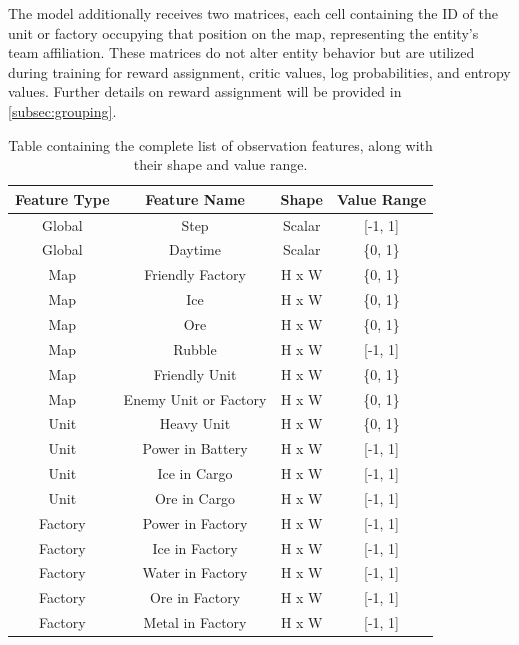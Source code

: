 \bigskip

\noindent The model additionally receives two matrices, each cell containing the ID of the unit or factory occupying that position on the map, representing the entity's team affiliation. These matrices do not alter entity behavior but are utilized during training for reward assignment, critic values, log probabilities, and entropy values. Further details on reward assignment will be provided in \autoref{subsec:grouping}.

\begin{table}[htbp]
    \centering
    \begin{tabular}{cccc}
        \hline
        Feature Type & Feature Name & Shape & Value Range \\
        \hline
        Global & Step & Scalar & [-1, 1] \\
        Global & Daytime & Scalar & \{0, 1\} \\
        \hline
        Map & Friendly Factory & H x W & \{0, 1\} \\
        Map & Ice & H x W & \{0, 1\} \\
        Map & Ore & H x W & \{0, 1\} \\
        Map & Rubble & H x W & [-1, 1] \\
        Map & Friendly Unit & H x W & \{0, 1\} \\
        Map & Enemy Unit or Factory & H x W & \{0, 1\} \\
        \hline
        Unit & Heavy Unit & H x W & \{0, 1\} \\
        Unit & Power in Battery & H x W & [-1, 1] \\
        Unit & Ice in Cargo & H x W & [-1, 1] \\
        Unit & Ore in Cargo & H x W & [-1, 1] \\
        \hline
        Factory & Power in Factory & H x W & [-1, 1] \\
        Factory & Ice in Factory & H x W & [-1, 1] \\
        Factory & Water in Factory & H x W & [-1, 1] \\
        Factory & Ore in Factory & H x W & [-1, 1] \\
        Factory & Metal in Factory & H x W & [-1, 1] \\
        \hline
    \end{tabular}
    \captionsetup{justification=justified, singlelinecheck=false, width=1\linewidth, labelfont=bf}
    \caption{Table containing the complete list of observation features, along with their shape and value range.}
    \label{tab:features}
\end{table}

